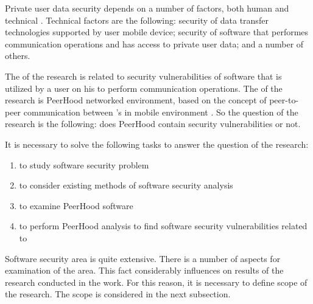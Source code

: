%
Private user data security depends on a number of factors, both human and technical . 
%
Technical factors are the following: security of data transfer technologies supported by user mobile device; security of software that performes communication operations and has access to private user data; and a number of others. 

%
The  of the research is related to security vulnerabilities of software that is utilized by a user on his  to perform communication operations. 
%
The  of the research is PeerHood networked environment, based on the concept of peer-to-peer communication between 's in mobile environment . 
%
So the question of the research is the following: does PeerHood contain security vulnerabilities or not. 

%
It is necessary to solve the following tasks to answer the question of the research: 
\begin{enumerate}
	\item to study software security problem
	\item to consider existing methods of software security analysis
	\item to examine PeerHood software
	\item to perform PeerHood analysis to find software security vulnerabilities related to 
\end{enumerate}

%
Software security area is quite extensive. 
%
There is a number of aspects for examination of the area. 
%
This fact considerably influences on \The results of the research conducted in the work. 
%
For this reason, it is necessary to define \The scope of the research. 
%
The scope is considered in the next subsection. 
